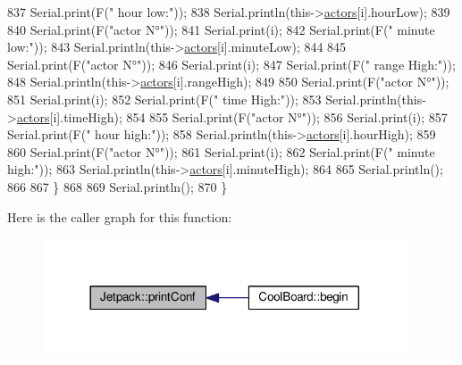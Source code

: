 \begin{DoxyCode}
837         Serial.print(F(\textcolor{stringliteral}{" hour low:"}));
838         Serial.println(this->\hyperlink{class_jetpack_a7e16d2f97837f9712a2e6de1c50d99db}{actors}[i].hourLow);
839 
840         Serial.print(F(\textcolor{stringliteral}{"actor N°"}));
841         Serial.print(i);
842         Serial.print(F(\textcolor{stringliteral}{" minute low:"}));
843         Serial.println(this->\hyperlink{class_jetpack_a7e16d2f97837f9712a2e6de1c50d99db}{actors}[i].minuteLow);
844 
845         Serial.print(F(\textcolor{stringliteral}{"actor N°"}));
846         Serial.print(i);
847         Serial.print(F(\textcolor{stringliteral}{" range High:"}));
848         Serial.println(this->\hyperlink{class_jetpack_a7e16d2f97837f9712a2e6de1c50d99db}{actors}[i].rangeHigh);
849 
850         Serial.print(F(\textcolor{stringliteral}{"actor N°"}));
851         Serial.print(i);
852         Serial.print(F(\textcolor{stringliteral}{" time High:"}));
853         Serial.println(this->\hyperlink{class_jetpack_a7e16d2f97837f9712a2e6de1c50d99db}{actors}[i].timeHigh);
854 
855         Serial.print(F(\textcolor{stringliteral}{"actor N°"}));
856         Serial.print(i);
857         Serial.print(F(\textcolor{stringliteral}{" hour high:"}));
858         Serial.println(this->\hyperlink{class_jetpack_a7e16d2f97837f9712a2e6de1c50d99db}{actors}[i].hourHigh);
859 
860         Serial.print(F(\textcolor{stringliteral}{"actor N°"}));
861         Serial.print(i);
862         Serial.print(F(\textcolor{stringliteral}{" minute high:"}));
863         Serial.println(this->\hyperlink{class_jetpack_a7e16d2f97837f9712a2e6de1c50d99db}{actors}[i].minuteHigh);
864 
865         Serial.println(); 
866 
867     \}
868 
869     Serial.println();
870 \}
\end{DoxyCode}
Here is the caller graph for this function\+:\nopagebreak
\begin{figure}[H]
\begin{center}
\leavevmode
\includegraphics[width=305pt]{df/d1d/class_jetpack_ac54a7bb4f9166bee32052253d9b1d306_icgraph}
\end{center}
\end{figure}
\mbox{\label{class_jetpack_a338f1af8cbc6504ac69b47c7328569b5}} 
